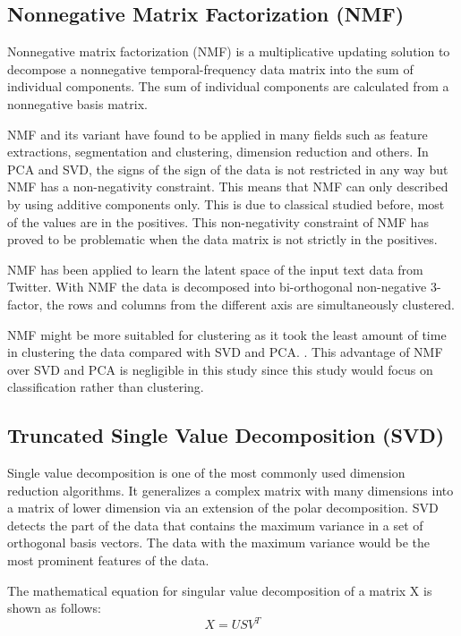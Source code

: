 \subsection{Nonnegative Matrix Factorization (NMF)}
Nonnegative matrix factorization (NMF) is a multiplicative updating solution to decompose a nonnegative temporal-frequency data matrix into the sum of individual components. The sum of individual components are calculated from a nonnegative basis matrix. \cite{nmfBook}

NMF and its variant have found to be applied in many fields such as feature extractions, segmentation and clustering, dimension reduction and others. In PCA and SVD, the signs of the sign of the data is not restricted in any way but NMF has a non-negativity constraint. This means that NMF can only described by using additive components only. This is due to classical studied before, most of the values are in the positives. This non-negativity constraint of NMF has proved to be problematic when the data matrix is not strictly in the positives. \cite{semiNmfPca}

NMF has been applied to learn the latent space of the input text data from Twitter. With NMF the data is decomposed into bi-orthogonal non-negative 3-factor, the rows and columns from the different axis are simultaneously clustered. \cite{nmfTwitter}

NMF might be more suitabled for clustering as it took the least amount of time in clustering the data compared with SVD and PCA. \cite{nmfClustering}. This advantage of NMF over SVD and PCA is negligible in this study since this study would focus on classification rather than clustering.\\

\clearpage
\subsection{Truncated Single Value Decomposition (SVD)}
Single value decomposition is one of the most commonly used dimension reduction algorithms. It generalizes a complex matrix with many dimensions into a matrix of lower dimension via an extension of the polar decomposition. SVD detects the part of the data that contains the maximum variance in a set of orthogonal basis vectors. The data with the maximum variance would be the most prominent features of the data. \cite{svdDef}

The mathematical equation for singular value decomposition of a matrix X is shown as follows:
\begin{equation}
X = USV^{T}
\end{equation}

